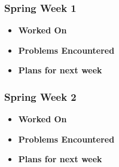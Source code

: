 \documentclass[compsoc,draftclsnofoot,onecolumn,10pt]{IEEEtran}
\begin{document}
\subsubsection{Spring Week 1}
\begin{itemize}
    \item {\textbf{Worked On}}
    \begin{itemize}

    \end{itemize}

    \item {\textbf{Problems Encountered}}
    \begin{itemize}

    \end{itemize}

    \item{\textbf{Plans for next week}}
    \begin{itemize}

    \end{itemize}

\end{itemize}

\subsubsection{Spring Week 2}
\begin{itemize}
    \item {\textbf{Worked On}}
    \begin{itemize}

    \end{itemize}

    \item {\textbf{Problems Encountered}}
    \begin{itemize}

    \end{itemize}

    \item{\textbf{Plans for next week}}
    \begin{itemize}

    \end{itemize}

\end{itemize}
\end{document}
